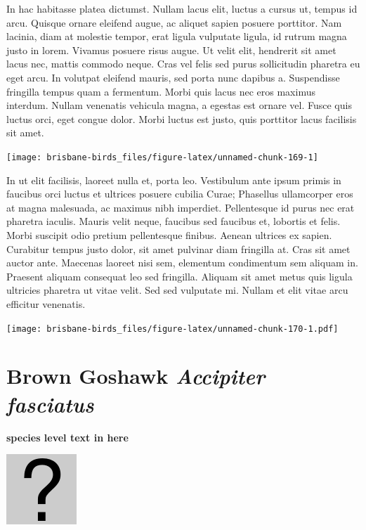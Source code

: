 \documentclass[]{book}
\let\origfigure\figure
\let\endorigfigure\endfigure
\renewenvironment{figure}[1][2] {
  \expandafter\origfigure\expandafter[H]
} {
  \endorigfigure
}
\begin{document}
In hac habitasse platea dictumst. Nullam lacus elit, luctus a cursus ut,
tempus id arcu. Quisque ornare eleifend augue, ac aliquet sapien posuere
porttitor. Nam lacinia, diam at molestie tempor, erat ligula vulputate
ligula, id rutrum magna justo in lorem. Vivamus posuere risus augue. Ut
velit elit, hendrerit sit amet lacus nec, mattis commodo neque. Cras vel
felis sed purus sollicitudin pharetra eu eget arcu. In volutpat eleifend
mauris, sed porta nunc dapibus a. Suspendisse fringilla tempus quam a
fermentum. Morbi quis lacus nec eros maximus interdum. Nullam venenatis
vehicula magna, a egestas est ornare vel. Fusce quis luctus orci, eget
congue dolor. Morbi luctus est justo, quis porttitor lacus facilisis sit
amet.

\begin{figure}
\texttt{[image: brisbane-birds\_files/figure-latex/unnamed-chunk-169-1]} \caption{insert figure caption}\label{fig:unnamed-chunk-169}
\end{figure}

In ut elit facilisis, laoreet nulla et, porta leo. Vestibulum ante ipsum
primis in faucibus orci luctus et ultrices posuere cubilia Curae;
Phasellus ullamcorper eros at magna malesuada, ac maximus nibh
imperdiet. Pellentesque id purus nec erat pharetra iaculis. Mauris velit
neque, faucibus sed faucibus et, lobortis et felis. Morbi suscipit odio
pretium pellentesque finibus. Aenean ultrices ex sapien. Curabitur
tempus justo dolor, sit amet pulvinar diam fringilla at. Cras sit amet
auctor ante. Maecenas laoreet nisi sem, elementum condimentum sem
aliquam in. Praesent aliquam consequat leo sed fringilla. Aliquam sit
amet metus quis ligula ultricies pharetra ut vitae velit. Sed sed
vulputate mi. Nullam et elit vitae arcu efficitur venenatis.

\begin{figure}
\centering
\texttt{[image: brisbane-birds\_files/figure-latex/unnamed-chunk-170-1.pdf]}
\caption{\label{fig:unnamed-chunk-170}insert figure caption}
\end{figure}

\section{\texorpdfstring{Brown Goshawk \emph{Accipiter
fasciatus}}{Brown Goshawk Accipiter fasciatus}}\label{brown-goshawk-accipiter-fasciatus}

\textbf{species level text in here}

\begin{figure}
\centering
\includegraphics{assets/missing.png}
\caption{No image for species}
\end{figure}
\end{document}
